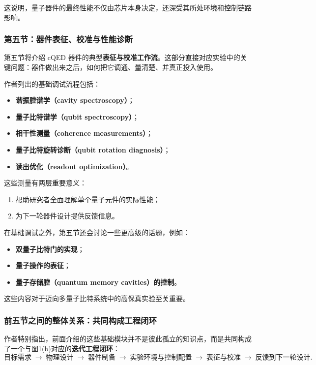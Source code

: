\documentclass[12pt,a4paper,oneside]{ctexbook}
\begin{document}
这说明，量子器件的最终性能不仅由芯片本身决定，还深受其所处环境和控制链路影响。

\subsubsection{第五节：器件表征、校准与性能诊断}

第五节将介绍 cQED 器件的典型\textbf{表征与校准工作流}。这部分直接对应实验中的关键问题：器件做出来之后，如何把它调通、量清楚、并真正投入使用。

作者列出的基础调试流程包括：
\begin{itemize}[leftmargin=2em]
    \item \textbf{谐振腔谱学（cavity spectroscopy）}；
    \item \textbf{量子比特谱学（qubit spectroscopy）}；
    \item \textbf{相干性测量（coherence measurements）}；
    \item \textbf{量子比特旋转诊断（qubit rotation diagnosis）}；
    \item \textbf{读出优化（readout optimization）}。
\end{itemize}

这些测量有两层重要意义：
\begin{enumerate}[leftmargin=2em]
    \item 帮助研究者全面理解单个量子元件的实际性能；
    \item 为下一轮器件设计提供反馈信息。
\end{enumerate}

在基础调试之外，第五节还会讨论一些更高级的话题，例如：
\begin{itemize}[leftmargin=2em]
    \item \textbf{双量子比特门的实现}；
    \item \textbf{量子操作的表征}；
    \item \textbf{量子存储腔（quantum memory cavities）的控制}。
\end{itemize}

这些内容对于迈向多量子比特系统中的高保真实验至关重要。

\subsubsection{前五节之间的整体关系：共同构成工程闭环}

作者特别指出，前面介绍的这些基础模块并不是彼此孤立的知识点，而是共同构成了一个与图1(b)对应的\textbf{迭代工程闭环}：
\[
\text{目标需求}
\;\to\;
\text{物理设计}
\;\to\;
\text{器件制备}
\;\to\;
\text{实验环境与控制配置}
\;\to\;
\text{表征与校准}
\;\to\;
\text{反馈到下一轮设计}.
\]
\end{document}
